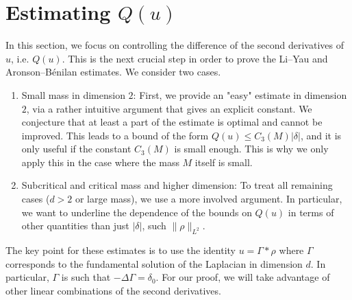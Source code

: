\documentclass[11pt,a4paper]{article}
\numberwithin{equation}{section}
\theoremstyle{plain}
\theoremstyle{remark}
\begin{document}
\section{Estimating \texorpdfstring{$Q(u)$}{Q(u)}}\label{sec:d11-d22}

In this section, we focus on controlling the difference of the second derivatives of $u$, i.e. $Q(u)$. This is the next crucial step in order to prove the  Li--Yau and Aronson--B\'enilan estimates. We consider two cases. 
\begin{enumerate}
\item Small mass in dimension $2$: First, we provide an "easy" estimate in dimension $2$, via a rather intuitive argument that gives an explicit constant. We conjecture that at least a part of the estimate is optimal and cannot be improved. This leads to a bound of the form $Q(u)\leq C_3(M)|\delta|$, and it is only useful if the constant $C_3(M)$ is small enough. This is why we only apply this in the case where the mass $M$ itself is small.
\item Subcritical and critical mass and higher dimension: To treat all remaining cases ($d>2$ or large mass), we use a more involved argument. In particular, we want to underline the dependence of the bounds on $Q(u)$ in terms of other quantities than just $|\delta|$, such  $\|\rho\|_{L^2}$.
\end{enumerate}

The key point for these estimates is to use the identity $u=\Gamma*\rho$ where $\Gamma$ corresponds to the fundamental solution of the Laplacian in dimension $d$. In particular, $\Gamma$ is such that $-\Delta\Gamma=\delta_0$. For our proof, we will take advantage of other linear combinations of the second derivatives.
\end{document}
